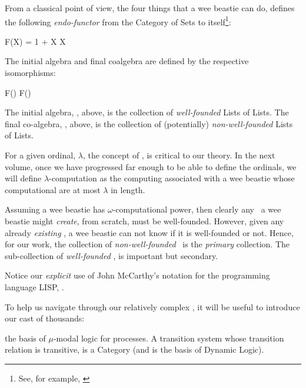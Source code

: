 \stopDefinition

\startMMundi From a classical point of view, the four things that a 
wee beastie can do, defines the following \emph{endo-functor} from the 
Category of Sets to itself\footnote{See, for example, 
\cite{jacobs2017coalgebras}}: 

\placeformula[+]\startformula
  F(X) = 1 + X \times X
\stopformula

\noindent The initial algebra and final coalgebra are defined by the 
respective isomorphisms: 

\placesubformula\startformula\startalign
  \NC F(\wflol) \NC \longRightIsoArrow \wflol  \NR[eq:a][a]
  \NC \lol      \NC \longRightIsoArrow F(\lol) \NR[eq:b][b]
\stopalign\stopformula

\noindent The initial algebra, \wflol, above, is the collection of 
\emph{well-founded} Lists of Lists. The final co-algebra, \lol, above, is 
the collection of (potentially) \emph{non-well-founded} Lists of Lists. 

For a given ordinal, $\lambda$, the concept of 
, is critical to our theory. In the 
next volume, once we have progressed far enough to be able to define the 
ordinals, we will define $\lambda$-computation as the computing 
 associated with a wee beastie whose computational 
 are at most $\lambda$ in length. 

Assuming a wee beastie has $\omega$-computational power, then clearly any 
\lol\ a wee beastie might \emph{create}, from scratch, must be 
well-founded. However, given any already \emph{existing} \lol, a wee 
beastie can not know if it is well-founded or not. Hence, for our work, 
the collection of \emph{non-well-founded} \lols\ is the \emph{primary} 
collection. The sub-collection of \emph{well-founded} \lols, is important 
but secondary. 

Notice our \emph{explicit} use of John McCarthy's notation for the 
programming language LISP, 
\cite{mcCarthyAbrahamsEdwardsHartLevin1965lispManual}. \stopMMundi 

\startMMundi

To help us navigate through our relatively complex , it will 
be useful to introduce our cast of thousands: 

\startitemize[n]

\item {} the basis of $\mu$-modal logic for 
processes. A transition system whose transition relation is transitive, is 
a Category (and is the basis of Dynamic Logic). 

